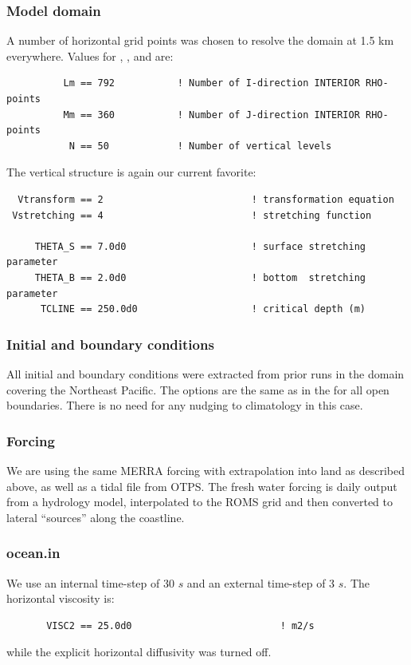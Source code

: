 \subsubsection{Model domain}
A number of horizontal grid points was chosen to resolve the
domain at 1.5 km everywhere. Values
for , , and  are:
\begin{verbatim}
          Lm == 792           ! Number of I-direction INTERIOR RHO-points
          Mm == 360           ! Number of J-direction INTERIOR RHO-points
           N == 50            ! Number of vertical levels
\end{verbatim}
The vertical structure is again our current favorite:
\begin{verbatim}
  Vtransform == 2                          ! transformation equation
 Vstretching == 4                          ! stretching function

     THETA_S == 7.0d0                      ! surface stretching parameter
     THETA_B == 2.0d0                      ! bottom  stretching parameter
      TCLINE == 250.0d0                    ! critical depth (m)
\end{verbatim}

\subsubsection{Initial and boundary conditions}
All initial and boundary conditions were extracted from prior runs
in the  domain covering the Northeast Pacific. The
 options are the same as in the  for all
open boundaries. There is no need for any nudging to climatology
in this case.

\subsubsection{Forcing}
We are using the same MERRA forcing with extrapolation into land as
described above, as well as a tidal file from OTPS. The fresh water
forcing is daily output from a hydrology model, interpolated to the
ROMS grid and then converted to lateral ``sources'' along the
coastline.

\subsubsection{ocean.in}
We use an internal time-step of 30 $s$ and an external time-step of
3 $s$. The horizontal viscosity is:
\begin{verbatim}
       VISC2 == 25.0d0                          ! m2/s
\end{verbatim}
while the explicit horizontal diffusivity was turned off.

